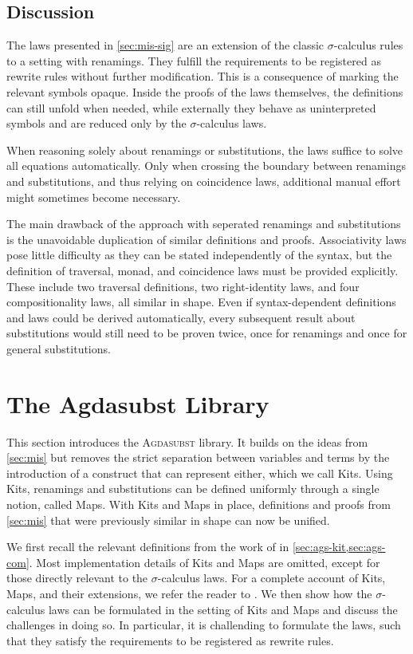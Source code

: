 \documentclass[screen,nonacm]{acmart}
\begin{document}
\subsection{Discussion}\label{sec:mis-dis}
The laws presented in \cref{sec:mis-sig} are an extension of the classic
$σ$-calculus rules to a setting with renamings. They fulfill the requirements
to be registered as rewrite rules without further modification. This is a
consequence of marking the relevant symbols opaque. Inside the proofs of the
laws themselves, the definitions can still unfold when needed, while externally
they behave as uninterpreted symbols and are reduced only by the $σ$-calculus
laws.

When reasoning solely about renamings or substitutions, the laws suffice to
solve all equations automatically. Only when crossing the boundary between
renamings and substitutions, and thus relying on coincidence laws, additional
manual effort might sometimes become necessary.

The main drawback of the approach with seperated renamings and substitutions is
the unavoidable duplication of similar definitions and proofs. Associativity
laws pose little difficulty as they can be stated independently of the syntax,
but the definition of traversal, monad, and coincidence laws must be provided
explicitly. These include two traversal definitions, two right-identity laws,
and four compositionality laws, all similar in shape. Even if syntax-dependent
definitions and laws could be derived automatically, every subsequent result
about substitutions would still need to be proven twice, once for renamings and
once for general substitutions.

\section{The Agdasubst Library}\label{sec:ags}
This section introduces the \textsc{Agdasubst} library. It builds on the ideas
from \cref{sec:mis} but removes the strict separation between variables and
terms by the introduction of a construct that can represent either, which we
call Kits. Using Kits, renamings and substitutions can be defined uniformly
through a single notion, called Maps. With Kits and Maps in place, definitions
and proofs from \cref{sec:mis} that were previously similar in shape can now be
unified.

We first recall the relevant definitions from the work of
\citet{saffrich:LIPIcs.ITP.2024.32} in \cref{sec:ags-kit,sec:ags-com}. Most
implementation details of Kits and Maps are omitted, except for those directly
relevant to the $σ$-calculus laws. For a complete account of Kits, Maps, and
their extensions, we refer the reader to \citet{saffrich:LIPIcs.ITP.2024.32}.
We then show how the $σ$-calculus laws can be formulated in the setting of Kits
and Maps and discuss the challenges in doing so. In particular, it is
challending to formulate the laws, such that they satisfy the requirements to
be registered as rewrite rules.
\end{document}
